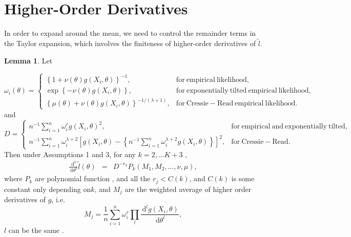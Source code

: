 \documentclass[oneside,english]{amsbook}
\numberwithin{section}{chapter}
\numberwithin{equation}{section}
\numberwithin{figure}{section}
\theoremstyle{plain}
\theoremstyle{plain}
\theoremstyle{definition}
\theoremstyle{plain}
\theoremstyle{plain}
\theoremstyle{remark}
\theoremstyle{definition}
\newtheorem{lemma}{Lemma}
\theoremstyle{definition}
\newcommand{\diff}{\,\mathrm{d}}
\begin{document}
\section{Higher-Order Derivatives}\label{app:high-order-der}

In order to expand around the mean, we need to control the
remainder terms in the Taylor expansion, which involves the finiteness of higher-order
derivatives of $\tilde{l}$. 
\begin{lemma}
\label{lem:control-higher-order-derivative-l}Let%

{} 
\[
\omega_{i}\left(\theta\right)=\begin{cases}
\left\{ 1+\nu\left(\theta\right)g\left(X_{i},\theta\right)\right\} ^{-1}, & \mathrm{for\: empirical\: likelihood,}\\
\exp\left\{ -\nu\left(\theta\right)g\left(X_{i},\theta\right)\right\} , & \mathrm{for\: exponentially\: tilted\: empirical\: likelihood,}\\
\left\{ \mu\left(\theta\right)+\nu\left(\theta\right)g\left(X_{i},\theta\right)\right\} ^{-1/\left(\lambda+1\right)}, & \mathrm{for\: Cressie-Read\: empirical\: likelihood.}
\end{cases}
\]
and 
\[
D=\begin{cases}
n^{-1}\sum_{i=1}^{n}\omega_{i}^{r}g\left(X_{i},\theta\right)^{2}, & \mathrm{for\: empirical\: and\: exponentially\:tilted,}\\
n^{-1}\sum_{i=1}^{n}\omega_{i}^{\lambda+2}\left[g\left(X_{i},\theta\right)-\left\{ n^{-1}\sum_{i=1}^{n}\omega_{i}^{\lambda+2}g\left(X_{i},\theta\right)\right\} \right]^{2}, & \mathrm{for\: Cressie-Read.}
\end{cases}
\]
Then  under Assumptions 1 and 3, for any $k=2,\ldots K+3$ , 
\begin{eqnarray*}
\frac{\diff^{k}}{\diff\theta^{k}}\tilde{l}\left(\theta\right) & = & D^{-r_{k}}P_{k}\left(M_{1},M_{2},\ldots,\nu,\mu\right),
\end{eqnarray*}
where $P_{k}$ are polynomial function , and all the $r_{j}<C\left(k\right)$,
and $C\left(k\right)$ is some constant only depending on$k$, and
$M_{j}$ are the weighted average of higher order derivatives of $g$,
i.e. 
\[
M_{j}=\frac{1}{n}\sum_{i=1}^{n}\omega_{i}^{r}\prod_{l}\frac{\diff^{l}g\left(X_{i},\theta\right)}{\diff\theta^{l}},
\]
$l$ can be the same . \end{lemma}
\end{document}
